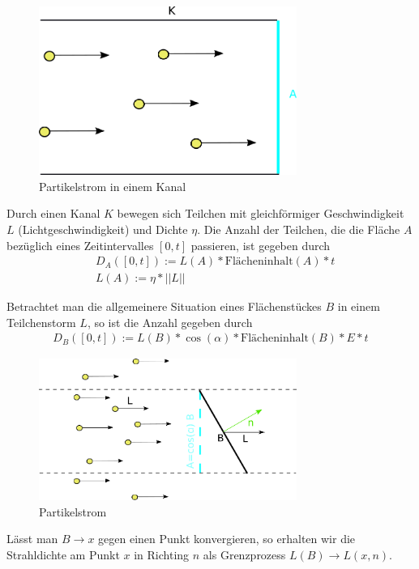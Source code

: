  \begin{figure}[H]
    \centering
    \includegraphics[width=0.75\textwidth]{images/Partikelstrom.png}
    \caption{Partikelstrom in einem Kanal}
    \label{fig:cray}
\end{figure}
Durch einen Kanal $K$ bewegen  sich Teilchen mit gleichförmiger Geschwindigkeit $L$ (Lichtgeschwindigkeit)  und  Dichte $\eta$.
Die Anzahl der Teilchen, die die Fläche $A$ bezüglich eines Zeitintervalles $[0,t]$ passieren, ist gegeben durch
\begin{align}
& D_A([0,t]) :=L(A) *  \text{Flächeninhalt}(A) *   t \\
& L(A):= \eta * ||L||  
\end{align}

 Betrachtet man die allgemeinere Situation eines Flächenstückes $B$  in einem Teilchenstorm $L$, so ist die Anzahl gegeben durch 
\begin{align}
D_B([0,t]) :=L(B) * \cos(\alpha) *  \text{Flächeninhalt} (B) *   E * t
 \end{align}
\begin{figure}[H]
    \centering
    \includegraphics[width=0.75\textwidth]{images/Strahldichte.png}
    \caption{Partikelstrom}
    \label{fig:cray}
\end{figure}

Lässt man $B \to x$ gegen einen Punkt konvergieren, so erhalten wir die Strahldichte  am Punkt $x$ in Richting $n$ als Grenzprozess  $L(B) \to L(x, n)$.


